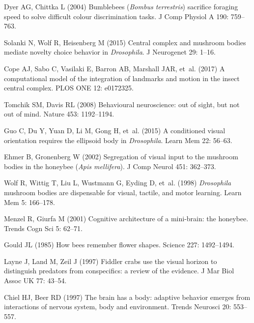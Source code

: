\begin{thebibliography}{10}
	Dyer AG, Chittka L (2004) {Bumblebees (\emph{Bombus terrestris}) sacrifice
		foraging speed to solve difficult colour discrimination tasks}.
	\newblock J Comp Physiol A 190: 759--763.
	
	Solanki N, Wolf R, Heisenberg M (2015) Central complex and mushroom bodies
	mediate novelty choice behavior in \emph{Drosophila}.
	\newblock J Neurogenet 29: 1--16.
	
	Cope AJ, Sabo C, Vasilaki E, Barron AB, Marshall JAR, et~al. (2017) {A
		computational model of the integration of landmarks and motion in the insect
		central complex}.
	\newblock PLOS ONE 12: e0172325.
	
	Tomchik SM, Davis RL (2008) Behavioural neuroscience: out of sight, but not out
	of mind.
	\newblock Nature 453: 1192--1194.
	
	Guo C, Du Y, Yuan D, Li M, Gong H, et~al. (2015) A conditioned visual
	orientation requires the ellipsoid body in \emph{Drosophila}.
	\newblock Learn Mem 22: 56--63.
	
	Ehmer B, Gronenberg W (2002) Segregation of visual input to the mushroom bodies
	in the honeybee (\emph{Apis mellifera}).
	\newblock J Comp Neurol 451: 362--373.
	
	Wolf R, Wittig T, Liu L, Wustmann G, Eyding D, et~al. (1998) \emph{Drosophila}
	mushroom bodies are dispensable for visual, tactile, and motor learning.
	\newblock Learn Mem 5: 166--178.
	
	Menzel R, Giurfa M (2001) Cognitive architecture of a mini-brain: the honeybee.
	\newblock Trends Cogn Sci 5: 62--71.
	
	Gould JL (1985) How bees remember flower shapes.
	\newblock Science 227: 1492--1494.
	
	Layne J, Land M, Zeil J (1997) Fiddler crabs use the visual horizon to
	distinguish predators from conspecifics: a review of the evidence.
	\newblock J Mar Biol Assoc UK 77: 43--54.
	
	Chiel HJ, Beer RD (1997) The brain has a body: adaptive behavior emerges from
	interactions of nervous system, body and environment.
	\newblock Trends Neurosci 20: 553--557.
	

\end{thebibliography}
